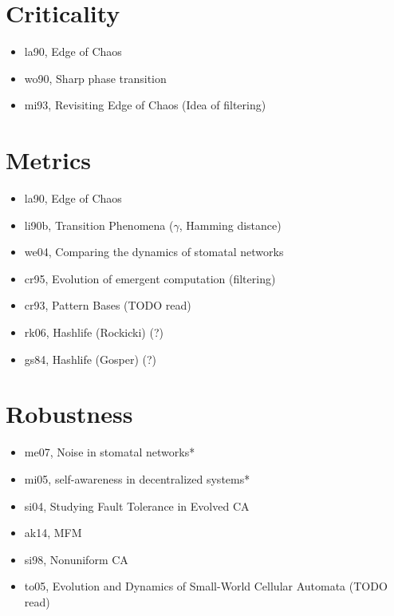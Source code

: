 \section{Criticality}
\begin{itemize}
\item la90, Edge of Chaos
\item wo90, Sharp phase transition
\item mi93, Revisiting Edge of Chaos (Idea of filtering)
\end{itemize}

\section{Metrics}
\begin{itemize}
\item la90, Edge of Chaos
\item li90b, Transition Phenomena ($\gamma$, Hamming distance)
\item we04, Comparing the dynamics of stomatal networks
\item cr95, Evolution of emergent computation (filtering)
\item cr93, Pattern Bases (TODO read)
\item rk06, Hashlife (Rockicki) (?)
\item gs84, Hashlife (Gosper) (?)
\end{itemize}

\section{Robustness}
\begin{itemize}[noitemsep, nolistsep]
\item me07, Noise in stomatal networks*

\item mi05, self-awareness in decentralized systems*

\item si04, Studying Fault Tolerance in Evolved CA
\item ak14, MFM
\item si98, Nonuniform CA

\item to05, Evolution and Dynamics of Small-World Cellular Automata (TODO read)
\end{itemize}

